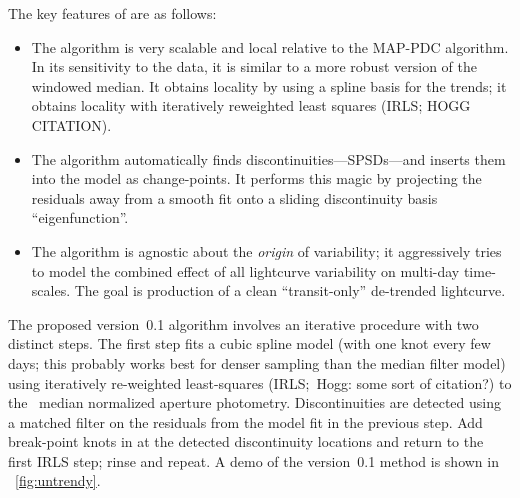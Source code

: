 \documentclass[letterpaper,12pt,preprint]{hack_aastex}
\newcommand{\Untrendy}{\package{Untrendy}}
\begin{document}
The key features of \Untrendy are as follows:
\begin{itemize}
\item The algorithm is very scalable and local relative to the MAP-PDC
  algorithm.
  In its sensitivity to the data, it is similar to a more robust version of the
  windowed median.
  It obtains locality by using a spline basis for the trends; it obtains
  locality with iteratively reweighted least squares (IRLS; HOGG CITATION).
\item The algorithm automatically finds discontinuities---SPSDs---and inserts
  them into the model as change-points.
  It performs this magic by projecting the residuals away from a smooth fit
  onto a sliding discontinuity basis ``eigenfunction''.
\item The algorithm is agnostic about the \emph{origin} of variability; it
  aggressively tries to model the combined effect of all lightcurve variability
  on multi-day time-scales.
  The goal is production of a clean ``transit-only'' de-trended lightcurve.
\end{itemize}

The proposed version~0.1 algorithm involves an iterative procedure with two distinct
steps.
The first step fits a cubic spline model (with one knot every few days; this
probably works best for denser sampling than the median filter model) using
iteratively re-weighted least-squares (IRLS;\ Hogg: some sort of citation?) to
the \Kepler\ median normalized aperture photometry.
Discontinuities are detected using a matched filter on the residuals
from the model fit in the previous step.
Add break-point knots in at the detected discontinuity locations and return to the first IRLS
step; rinse and repeat.  A demo of the version~0.1 method is shown in
\figurename~\ref{fig:untrendy}.%
\end{document}
